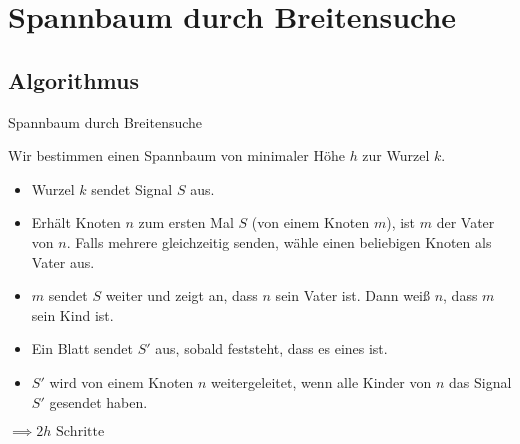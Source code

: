 \documentclass[18pt]{beamer}
\begin{document}
\section{Spannbaum durch Breitensuche}
\subsection{Algorithmus}
\begin{frame}{Spannbaum durch Breitensuche}
	
	Wir bestimmen einen Spannbaum von minimaler Höhe $h$ zur Wurzel $k$.
	\begin{itemize}
		\item Wurzel $k$ sendet Signal $S$ aus.
		\item Erhält Knoten $n$ zum ersten Mal $S$ (von einem Knoten $m$), ist $m$ der Vater von $n$. Falls mehrere gleichzeitig senden, wähle einen beliebigen Knoten als Vater aus.
		\item $m$ sendet $S$ weiter und zeigt an, dass $n$ sein Vater ist. Dann weiß $n$, dass $m$ sein Kind ist.
		\item Ein Blatt sendet $S'$ aus, sobald feststeht, dass es eines ist. 
		\item $S'$ wird von einem Knoten $n$ weitergeleitet, wenn alle Kinder von $n$ das Signal $S'$ gesendet haben.
	\end{itemize}
	$\implies 2h \text{ Schritte}$
\end{frame}
\end{document}

